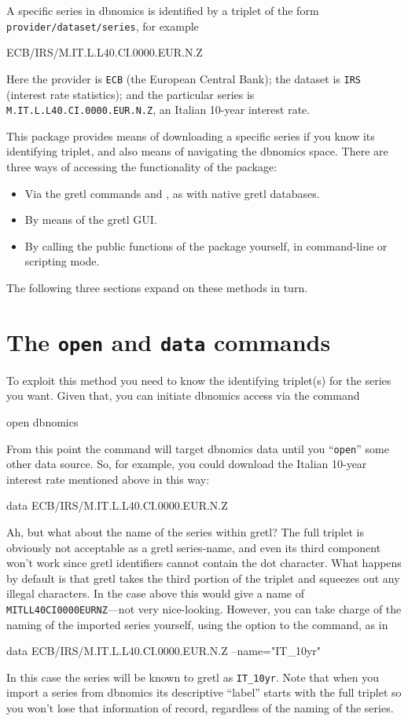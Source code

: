 \documentclass{article}
\begin{document}
A specific series in \textsf{dbnomics} is identified by a triplet
of the form \texttt{provider/dataset/series}, for example
\begin{code}
ECB/IRS/M.IT.L.L40.CI.0000.EUR.N.Z
\end{code}
Here the provider is \texttt{ECB} (the European Central Bank); the
dataset is \texttt{IRS} (interest rate statistics); and the particular
series is \texttt{M.IT.L.L40.CI.0000.EUR.N.Z}, an Italian 10-year
interest rate.

This package provides means of downloading a specific series if you
know its identifying triplet, and also means of navigating the
\textsf{dbnomics} space. There are three ways of accessing the
functionality of the package:
\begin{itemize}
\item Via the gretl commands  and , as with native
  gretl databases.
\item By means of the gretl GUI.
\item By calling the public functions of the package yourself, in
  command-line or scripting mode.
\end{itemize}
The following three sections expand on these methods in turn.

\section{The \texttt{open} and \texttt{data} commands}
\label{sec:open-data}

To exploit this method you need to know the identifying triplet(s) for
the series you want. Given that, you can initiate \textsf{dbnomics}
access via the command
\begin{code}
open dbnomics
\end{code}
From this point the  command will target \textsf{dbnomics}
data until you ``\texttt{open}'' some other data source. So, for
example, you could download the Italian 10-year interest rate
mentioned above in this way:
\begin{code}
data ECB/IRS/M.IT.L.L40.CI.0000.EUR.N.Z
\end{code}
Ah, but what about the name of the series within gretl? The full
triplet is obviously not acceptable as a gretl series-name, and even
its third component won't work since gretl identifiers cannot contain
the dot character. What happens by default is that gretl takes the
third portion of the triplet and squeezes out any illegal characters.
In the case above this would give a name of
\texttt{MITLL40CI0000EURNZ}---not very nice-looking. However, you can
take charge of the naming of the imported series yourself, using the
 option to the  command, as in
\begin{code}
data ECB/IRS/M.IT.L.L40.CI.0000.EUR.N.Z --name="IT_10yr"
\end{code}
In this case the series will be known to gretl as \texttt{IT\_10yr}.
Note that when you import a series from \textsf{dbnomics} its
descriptive ``label'' starts with the full triplet so you won't lose
that information of record, regardless of the naming of the series.
\end{document}
